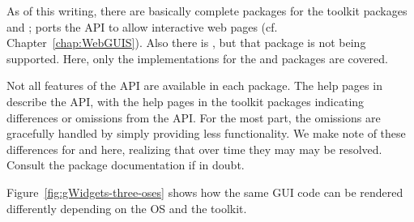 As of this writing, there are basically complete 
packages for the toolkit packages  and ;
 ports the API to allow interactive web pages
(cf. Chapter~\ref{chap:WebGUIS}). Also there is ,
but that package is not being supported. Here, only the
implementations for the  and  packages are
covered.

Not all features of the API are available in each package.  The help
pages in  describe the API, with the help pages in the
toolkit packages indicating differences or omissions from the API. For
the most part, the omissions are gracefully handled by simply
providing less functionality. We make note of these differences for
 and  here, realizing that over
time they may may be resolved. Consult the package documentation if in
doubt.

Figure~\ref{fig:gWidgets-three-oses} shows how the same GUI code
can be rendered differently depending on the OS and the
toolkit. 




